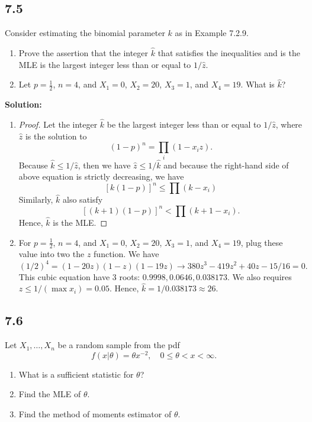 \documentclass[11pt]{article}
\newcommand{\Sol}{\par {\bf Solution:}}
\newcommand{\sample}[1]{#1_1 , \dots , #1_n}
\begin{document}
\subsection*{7.5}
Consider estimating the binomial parameter $k$ as in Example 7.2.9.

\begin{enumerate}[label=(\alph*)]
    \item Prove the assertion that the integer $\hat k$ that satisfies the inequalities and is the MLE is the largest integer less than or equal to $1/\hat z$.
    \item Let $p = \frac{1}{2}$, $n = 4$, and  $X_1 = 0$, $X_2 = 20$, $X_3 = 1$, and $X_4 = 19$. What is $\hat k$?
\end{enumerate}

\Sol
\begin{enumerate}[label=(\alph*)]
    \item
    \begin{proof}
        Let the integer $\hat k$ be the largest integer less than or equal to $1/{\hat z}$, where $\hat z$ is the solution to 
        \[
        (1-p)^n = \prod \limits_i (1-x_iz).
        \]
        Because $\hat k \le 1/{\hat z}$, then we have $\hat z \le 1/{\hat k}$ and because the right-hand side of above equation is strictly decreasing, we have \[
        [k(1-p)]^n  \le \prod (k-x_i)
        \]
        Similarly, $\hat k$ also satisfy \[
        [(k+1)(1-p)]^n < \prod (k+1 - x_i).
        \]
        Hence, $\hat k$ is the MLE.
    \end{proof}
    
    \item
    For $p = \frac{1}{2}$, $n = 4$, and  $X_1 = 0$, $X_2 = 20$, $X_3 = 1$, and $X_4 = 19$, plug these value into two the $z$ function. We have 
    \[
    (1/2)^4 = (1-20z)(1-z)(1-19z) \to 380z^3 - 419z^2 + 40z - 15/16 = 0.
    \]
    This cubic equation have 3 roots: $0.9998, 0.0646, 0.038173$. We also requires $z \le 1/(\max x_i) = 0.05$. Hence, $\hat k = 1/ 0.038173 \approx 26$.
    
\end{enumerate}

\subsection*{7.6}
Let $\sample{X}$ be a random sample from the pdf
\[
f(x|\theta) = \theta x^{-2}, \quad 0 \le \theta < x < \infty.
\]

\begin{enumerate}[label=(\alph*)]
    \item What is a sufficient statistic for $\theta$?
    \item Find the MLE of $\theta$.
    \item Find the method of moments estimator of $\theta$.
\end{enumerate}
\end{document}
